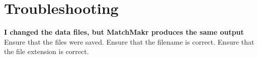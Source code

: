 \chapter{Troubleshooting}

\textbf{I changed the data files, but MatchMakr produces the same output}\\
Ensure that the files were saved.  Ensure that the filename is correct.  Ensure that the file extension is correct.